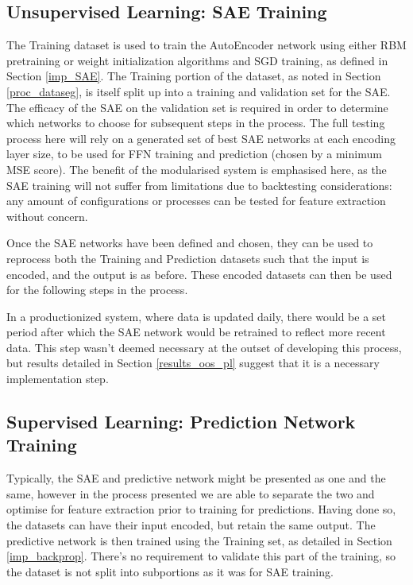 \documentclass[a4paper,11pt,oneside]{article}
\theoremstyle{plain}
\theoremstyle{definition}
\begin{document}
	\subsection{Unsupervised Learning: SAE Training}\label{proc_sae}
	
	The Training dataset is used to train the AutoEncoder network using either RBM pretraining or weight initialization algorithms and SGD training, as defined in Section \ref{imp_SAE}. The Training portion of the dataset, as noted in Section \ref{proc_dataseg}, is itself split up into a training and validation set for the SAE. The efficacy of the SAE on the validation set is required in order to determine which networks to choose for subsequent steps in the process. The full testing process here will rely on a generated set of best SAE networks at each encoding layer size, to be used for FFN training and prediction (chosen by a minimum MSE score). The benefit of the modularised system is emphasised here, as the SAE training will not suffer from limitations due to backtesting considerations: any amount of configurations or processes can be tested for feature extraction without concern. \newline
	
	Once the SAE networks have been defined and chosen, they can be used to reprocess both the Training and Prediction datasets such that the input is encoded, and the output is as before. These encoded datasets can then be used for the following steps in the process. \newline
	
	In a productionized system, where data is updated daily, there would be a set period after which the SAE network would be retrained to reflect more recent data. This step wasn't deemed necessary at the outset of developing this process, but results detailed in Section \ref{results_oos_pl} suggest that it is a necessary implementation step.\newline
	
	\subsection{Supervised Learning: Prediction Network Training}\label{proc_predictionnetwork}
	
	Typically, the SAE and predictive network might be presented as one and the same, however in the process presented we are able to separate the two and optimise for feature extraction prior to training for predictions. Having done so, the datasets can have their input encoded, but retain the same output. The predictive network is then trained using the Training set, as detailed in Section \ref{imp_backprop}. There's no requirement to validate this part of the training, so the dataset is not split into subportions as it was for SAE training. \newline
	
\end{document}
